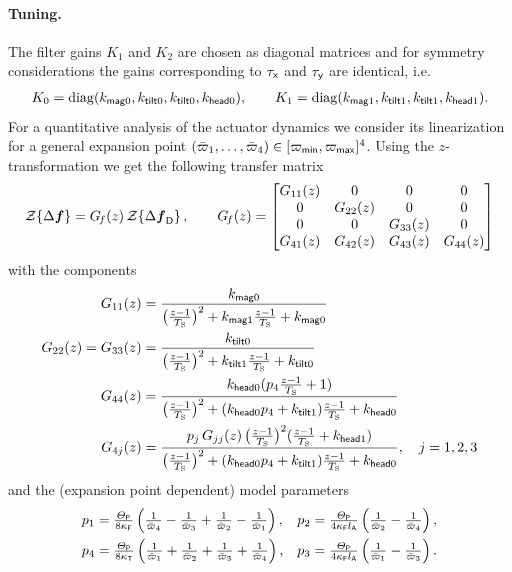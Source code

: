 \paragraph{Tuning.}
The filter gains $K_1$ and $K_2$ are chosen as diagonal matrices and for symmetry considerations the gains corresponding to $\taux$ and $\tauy$ are identical, i.e.\
\begin{align}
 K_0 = \diag(\kPMag, \kPTilt, \kPTilt, \kPHead),
\qquad
 K_1 = \diag(\kDMag, \kDTilt, \kDTilt, \kDHead).
\end{align}
For a quantitative analysis of the actuator dynamics we consider its linearization for a general expansion point $(\PropVelStat[1], \ldots, \PropVelStat[4]) \in [\PropVelMin, \PropVelMax]^4$.
Using the $z$-transformation we get the following transfer matrix 
\begin{align}
 \ZTrafo{\Delta \genForce} = \GenForceTransferFunction(z) \, \ZTrafo{\Delta \genForceD},
\qquad
 \GenForceTransferFunction(z) =
 \begin{bmatrix}
  G_{11}(z) & 0 & 0 & 0 \\
  0 & G_{22}(z) & 0 & 0 \\
  0 & 0 & G_{33}(z) & 0 \\
  G_{41}(z) & G_{42}(z) & G_{43}(z) & G_{44}(z) \\
 \end{bmatrix}
\end{align}
with the components
\begin{subequations}\label{eq:QuadActuatorDynTransferComponents}
\begin{align}
 G_{11}(z) &= \frac{\kPMag}{\big(\tfrac{z-1}{\Ts}\big)^2 + \kDMag \tfrac{z-1}{\Ts} + \kPMag}
\\
 G_{22}(z) = G_{33}(z) &= \frac{\kPTilt}{\big(\tfrac{z-1}{\Ts}\big)^2 + \kDTilt \tfrac{z-1}{\Ts} + \kPTilt}
\\
 G_{44}(z) &= \frac{\kPHead(p_4\tfrac{z-1}{\Ts} + 1)}{\big(\tfrac{z-1}{\Ts}\big)^2 + (\kPHead p_4 + \kDTilt) \tfrac{z-1}{\Ts} + \kPHead}
\\
 G_{4j}(z) &= \frac{p_j\,G_{jj}(z)\,\big(\tfrac{z-1}{\Ts}\big)^2 (\tfrac{z-1}{\Ts} + \kDHead)}{\big(\tfrac{z-1}{\Ts}\big)^2 + (\kPHead p_4 + \kDTilt) \tfrac{z-1}{\Ts} + \kPHead}, \quad j=1,2,3
\end{align}
\end{subequations}
and the (expansion point dependent) model parameters
\begin{subequations}
\begin{align}
 p_1 &= \tfrac{\PropInertia}{8\kappaF} \left( \tfrac{1}{\PropVelStat[4]} - \tfrac{1}{\PropVelStat[3]} + \tfrac{1}{\PropVelStat[2]} - \tfrac{1}{\PropVelStat[1]} \right),&
 p_2 &= \tfrac{\PropInertia}{4\kappaF\ArmRadius} \left( \tfrac{1}{\PropVelStat[2]} - \tfrac{1}{\PropVelStat[4]} \right),
\\
 p_4 &= \tfrac{\PropInertia}{8\kappaT} \left( \tfrac{1}{\PropVelStat[1]} + \tfrac{1}{\PropVelStat[2]} + \tfrac{1}{\PropVelStat[3]} + \tfrac{1}{\PropVelStat[4]} \right),&
 p_3 &= \tfrac{\PropInertia}{4\kappaF\ArmRadius} \left( \tfrac{1}{\PropVelStat[1]} - \tfrac{1}{\PropVelStat[3]} \right).
\end{align}
\end{subequations}
